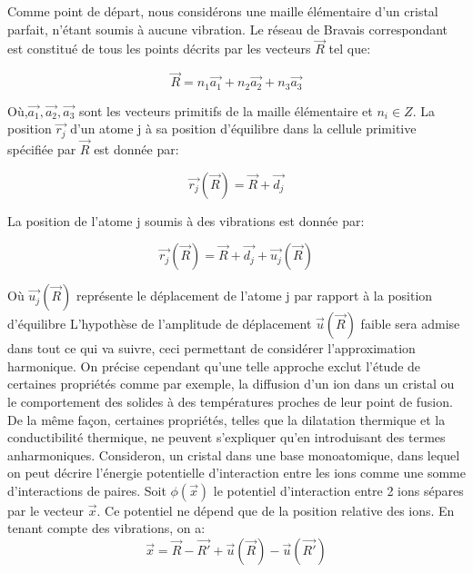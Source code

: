	Comme point de départ, nous considérons une maille élémentaire d'un cristal parfait, n'étant soumis à aucune vibration. Le réseau de Bravais correspondant est constitué de tous les points décrits par les vecteurs $\overrightarrow{R}$ tel que:
	
	\begin{equation}
	\overrightarrow{R}= n_{1}\overrightarrow{a_{1}} + n_{2}\overrightarrow{a_{2}} + n_{3}\overrightarrow{a_{3}}
	\end{equation}
	
Où,$\overrightarrow{a_{1}}, \overrightarrow{a_{2}}, \overrightarrow{a_{3}}$ sont les vecteurs primitifs de la maille élémentaire et $n_{i}\in Z$. La position $\overrightarrow{r_{j}}$ d'un atome j à sa position d'équilibre dans la cellule primitive spécifiée par $\overrightarrow{R}$ est donnée par:	

\begin{equation}
\overrightarrow{r_{j}} (\overrightarrow{R}) = \overrightarrow{R} + \overrightarrow{d_{j}}
\end{equation}

La position de l'atome j soumis à des vibrations est donnée par:

\begin{equation}
\overrightarrow{r_{j}} (\overrightarrow{R}) = \overrightarrow{R} + \overrightarrow{d_{j}} + \overrightarrow{u_{j}}(\overrightarrow{R})
\end{equation}	

Où $\overrightarrow{u_{j}}(\overrightarrow{R})$ représente le déplacement de l'atome j par rapport à la position d'équilibre L'hypothèse de l'amplitude de déplacement $\overrightarrow{u}(\overrightarrow{R})$ faible sera admise dans tout ce qui va suivre, ceci permettant de considérer l'approximation harmonique. On précise cependant qu'une telle approche exclut l'étude de certaines propriétés comme par exemple, la diffusion d'un ion dans un cristal ou le comportement des solides à des températures proches de leur point de fusion. De la même façon, certaines propriétés, telles que la dilatation thermique et la conductibilité thermique, ne peuvent s'expliquer qu'en introduisant des termes anharmoniques.
\bigskip
Consideron, un cristal dans une base monoatomique, dans lequel on peut décrire l'énergie potentielle d'interaction entre les ions comme une somme d'interactions de paires. Soit $\phi(\overrightarrow{x})$ le potentiel d'interaction entre 2 ions sépares par le vecteur $\overrightarrow{x}$. Ce potentiel ne dépend que de la position relative des ions. En tenant compte des vibrations, on a: 
\begin{equation}
\overrightarrow{x}= \overrightarrow{R} - \overrightarrow{R'} + \overrightarrow{u}(\overrightarrow{R}) -\overrightarrow{u}(\overrightarrow{R'})
\end{equation}

